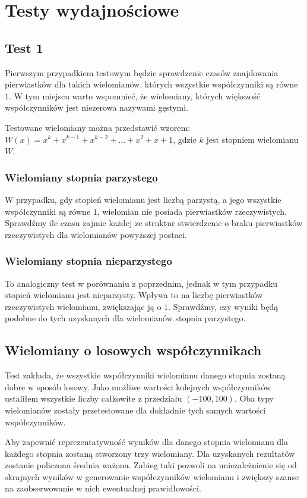 \section{Testy wydajnościowe}



\subsection{Test 1}

Pierwszym przypadkiem testowym będzie sprawdzenie czasów znajdowania pierwiastków dla takich wielomianów, których wszystkie współczynniki są równe $1$. W tym miejscu warto wspomnieć, że wielomiany, których większość współczynników jest niezerowa nazywami gęstymi.

Testowane wielomiany można przedstawić wzorem: \\
$W(x) = x^k + x^{k-1} + x^{k-2} + ... + x^2 + x + 1$, gdzie $k$ jest stopniem wielomianu $W$.

\subsubsection{Wielomiany stopnia parzystego}

W przypadku, gdy stopień wielomianu jest liczbą parzystą, a jego wszystkie współczynniki są równe $1$, wielomian nie posiada pierwiastków rzeczywistych. Sprawdźmy ile czasu zajmie każdej ze struktur stwierdzenie o braku pierwiastków rzeczywistych dla wielomianów powyższej postaci.

\subsubsection{Wielomiany stopnia nieparzystego}

To analogiczny test w porównaniu z poprzednim, jednak w tym przypadku stopień wielomianu jest nieparzysty. Wpływa to na liczbę pierwiastków rzeczywistych wielomianu, zwiększając ją o $1$. Sprawdźmy, czy wyniki będą podobne do tych uzyskanych dla wielomianów stopnia parzystego.

\subsection{Wielomiany o losowych współczynnikach}

Test zakłada, że wszystkie współczynniki wielomianu danego stopnia zostaną dobre w sposób losowy. Jako możliwe wartości kolejnych współczynników ustaliłem wszystkie liczby całkowite z przedziału $(-100, 100)$. Oba typy wielomianów zostały przetestowane dla dokładnie tych samych wartości współczynników.

Aby zapewnić reprezentatywność wyników dla danego stopnia wielomianu dla każdego stopnia zostaną stworzony trzy wielomiany. Dla uzyskanych rezultatów zostanie policzona średnia ważona. Zabieg taki pozwoli na uniezależnienie się od skrajnych wyników w generowanie współczynników wielomianu i zwiększy szanse na zaobserwowanie w nich ewentualnej prawidłowości.

